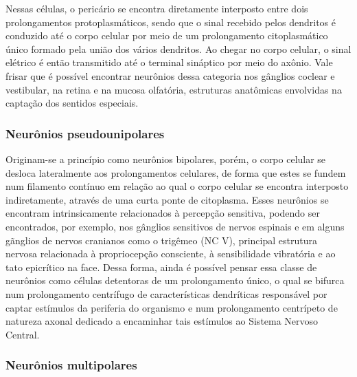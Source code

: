 \documentclass[
]{book}
\theoremstyle{definition}
\theoremstyle{definition}
\theoremstyle{definition}
\theoremstyle{definition}
\theoremstyle{remark}
\begin{document}
Nessas células, o pericário se encontra diretamente interposto entre dois prolongamentos protoplasmáticos, sendo que o sinal recebido pelos dendritos é conduzido até o corpo celular por meio de um prolongamento citoplasmático único formado pela união dos vários dendritos. Ao chegar no corpo celular, o sinal elétrico é então transmitido até o terminal sináptico por meio do axônio. Vale frisar que é possível encontrar neurônios dessa categoria nos gânglios coclear e vestibular, na retina e na mucosa olfatória, estruturas anatômicas envolvidas na captação dos sentidos especiais.

\hypertarget{neuruxf4nios-pseudounipolares}{%
\subsubsection*{Neurônios pseudounipolares}\label{neuruxf4nios-pseudounipolares}}

Originam-se a princípio como neurônios bipolares, porém, o corpo celular se desloca lateralmente aos prolongamentos celulares, de forma que estes se fundem num filamento contínuo em relação ao qual o corpo celular se encontra interposto indiretamente, através de uma curta ponte de citoplasma. Esses neurônios se encontram intrinsicamente relacionados à percepção sensitiva, podendo ser encontrados, por exemplo, nos gânglios sensitivos de nervos espinais e em alguns gãnglios de nervos cranianos como o trigêmeo (NC V), principal estrutura nervosa relacionada à propriocepção consciente, à sensibilidade vibratória e ao tato epicrítico na face. Dessa forma, ainda é possível pensar essa classe de neurônios como células detentoras de um prolongamento único, o qual se bifurca num prolongamento centrífugo de características dendríticas responsável por captar estímulos da periferia do organismo e num prolongamento centrípeto de natureza axonal dedicado a encaminhar tais estímulos ao Sistema Nervoso Central.

\hypertarget{neuruxf4nios-multipolares}{%
\subsubsection*{Neurônios multipolares}\label{neuruxf4nios-multipolares}}
\end{document}
